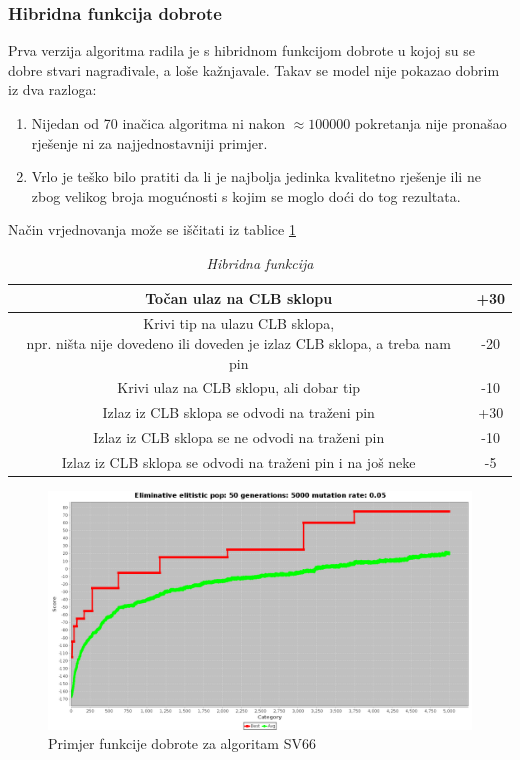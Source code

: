 \documentclass[times, utf8, zavrsni]{fer}
\begin{document}
	\subsubsection{Hibridna funkcija dobrote}
	
	Prva verzija algoritma radila je s hibridnom funkcijom dobrote u kojoj su se dobre stvari nagrađivale, a loše kažnjavale. Takav se model nije pokazao dobrim iz dva razloga:
	\begin{enumerate}
		\item Nijedan od 70 inačica algoritma ni nakon $\approx100000$ pokretanja nije pronašao rješenje ni za najjednostavniji primjer.
		\item Vrlo je teško bilo pratiti da li je najbolja jedinka kvalitetno rješenje ili ne zbog velikog broja mogućnosti s kojim se moglo doći do tog rezultata. 
	\end{enumerate}
	
	Način vrjednovanja može se iščitati iz tablice \ref{HibridnaFunkcija}
	
	
	\begin{table}[htb]
		\caption{\emph{Hibridna funkcija}}
		\label{HibridnaFunkcija}
		\centering
		\begin{tabular}{|c | c|} \hline
			Točan ulaz na CLB sklopu & +30 \\ \hline
			\makecell{Krivi tip na ulazu CLB sklopa, \\ npr. ništa nije dovedeno ili doveden je izlaz CLB sklopa, a treba nam pin} & -20 \\ \hline
			Krivi ulaz na CLB sklopu, ali dobar tip& -10 \\ \hline
			Izlaz iz CLB sklopa se odvodi na traženi pin & +30 \\ \hline
			Izlaz iz CLB sklopa se ne odvodi na traženi pin & -10 \\ \hline 
			Izlaz iz CLB sklopa se odvodi na traženi pin i na još neke & -5
		\end{tabular}
	\end{table}
	
	\begin{figure}[H]
		\centering
		\includegraphics[width=18cm]{slike/SV66Hibrid.png}
		\caption{Primjer funkcije dobrote za algoritam SV66}
		\label{fig:sv66-alg-hibrid}
	\end{figure} 
	
\end{document}

